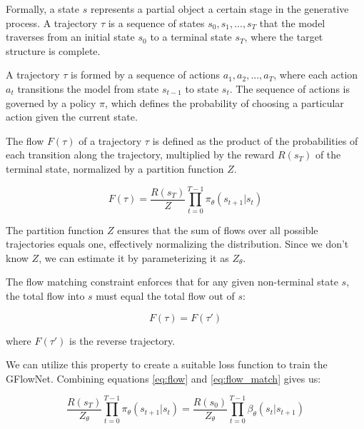 Formally, a state \( s \) represents a partial object a certain stage in the generative process. A trajectory \( \tau \) is a sequence of states \( s_0, s_1, ..., s_T \) that the model traverses from an initial state \( s_0 \) to a terminal state \( s_T \), where the target structure is complete.

A trajectory \( \tau \) is formed by a sequence of actions \( a_1, a_2, ..., a_T \), where each action \( a_t \) transitions the model from state \( s_{t-1} \) to state \( s_t \). The sequence of actions is governed by a policy \( \pi \), which defines the probability of choosing a particular action given the current state.


The flow \( F(\tau) \) of a trajectory \( \tau \) is defined as the product of the probabilities of each transition along the trajectory, multiplied by the reward \( R(s_T) \) of the terminal state, normalized by a partition function \( Z \).

\begin{equation} \label{eq:flow}
    F(\tau) = \frac{R(s_T)}{Z} \prod_{t=0}^{T-1} \pi_\theta(s_{t+1} | s_{t})
\end{equation}

The partition function \( Z \) ensures that the sum of flows over all possible trajectories equals one, effectively normalizing the distribution. Since we don't know \( Z \), we can estimate it by parameterizing it as \( Z_{\theta} \).

The flow matching constraint enforces that for any given non-terminal state \( s \), the total flow into \( s \) must equal the total flow out of \( s \):

\begin{equation} \label{eq:flow_match}
    F(\tau) = F(\tau')
\end{equation}

where \( F(\tau') \) is the reverse trajectory.

We can utilize this property to create a suitable loss function to train the GFlowNet. Combining equations \ref{eq:flow} and \ref{eq:flow_match} gives us:

\begin{equation}
    \frac{R(s_T)}{Z_\theta} \prod_{t=0}^{T-1} \pi_\theta(s_{t+1} | s_{t}) = \frac{R(s_0)}{Z_\theta} \prod_{t=0}^{T-1} \beta_\theta(s_{t} | s_{t+1})
\end{equation}

